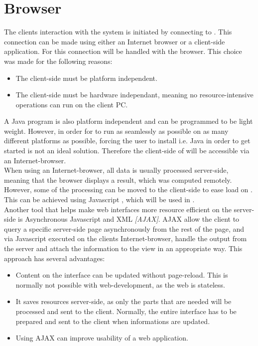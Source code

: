 
\section{Browser}\label{sec:design_client}
The clients interaction with the system is initiated by connecting to .
This connection can be made using either an Internet browser or a client-side application.
For \projectname{} this connection will be handled with the browser.
This choice was made for the following reasons:

\begin{itemize}
	\item The client-side must be platform independent.
	\item The client-side must be hardware independant, meaning no resource-intensive operations can run on the client PC.
\end{itemize}

A Java program is also platform independent and can be programmed to be light weight.
However, in order for \projectname{} to run as seamlessly as possible on as many different platforms as possible, forcing the user to install i.e. Java in order to get started is not an ideal solution.
Therefore the client-side of \projectname{} will be accessible via an Internet-browser. \\

When using an Internet-browser, all data is usually processed server-side, meaning that the browser displays a result, which was computed remotely.
However, some of the processing can be moved to the client-side to ease load on .
This can be achieved using Javascript \citep{what_is_javascript}, which will be used in \projectname{}. \\

Another tool that helps make web interfaces more resource efficient on the server-side is Asynchronous Javascript and XML \emph{[AJAX]}.
AJAX allow the client to query a specific server-side page asynchronously from the rest of the page, and via Javascript executed on the clients Internet-browser, handle the output from the server and attach the information to the view in an appropriate way.
This approach has several advantages:

\begin{itemize}
	\item Content on the interface can be updated without page-reload. This is normally not possible with web-development, as the web is stateless.
	\item It saves resources server-side, as only the parts that are needed will be processed and sent to the client. Normally, the entire interface has to be prepared and sent to the client when informations are updated.
	\item Using AJAX can improve usability of a web application.
\end{itemize}

